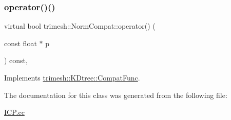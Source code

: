 \subsubsection{\texorpdfstring{operator()()}{operator()()}}
{\footnotesize\ttfamily virtual bool trimesh\+::\+Norm\+Compat\+::operator() (\begin{DoxyParamCaption}\item[{const float $\ast$}]{p }\end{DoxyParamCaption}) const\hspace{0.3cm}{\ttfamily [inline]}, {\ttfamily [virtual]}}



Implements \hyperlink{structtrimesh_1_1KDtree_1_1CompatFunc_a7a1e53ff346e21daac1bf003a21d2170}{trimesh\+::\+K\+Dtree\+::\+Compat\+Func}.



The documentation for this class was generated from the following file\+:\begin{DoxyCompactItemize}
\item 
\hyperlink{ICP_8cc}{I\+C\+P.\+cc}\end{DoxyCompactItemize}
